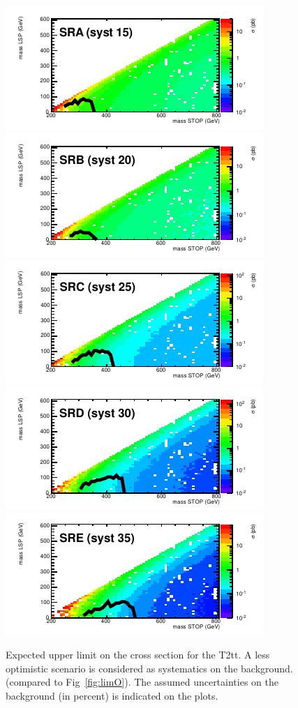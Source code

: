 \begin{figure}[hbt]
  \begin{center}
        \includegraphics[width=0.5\linewidth]{plots/stopPlot/masses_SRA_xsecP.pdf}%
        \includegraphics[width=0.5\linewidth]{plots/stopPlot/masses_SRB_xsecP.pdf}
        \includegraphics[width=0.5\linewidth]{plots/stopPlot/masses_SRC_xsecP.pdf}%
        \includegraphics[width=0.5\linewidth]{plots/stopPlot/masses_SRD_xsecP.pdf}
        \includegraphics[width=0.5\linewidth]{plots/stopPlot/masses_SRE_xsecP.pdf}%
    \caption{Expected upper limit on the cross section for the
      T2tt. A less optimistic scenario is considered as systematics on the
      background. (compared to Fig~\ref{fig:limO}).
The assumed uncertainties on the background (in percent) is indicated on the plots.}
\label{fig:limP}
      \end{center}
\end{figure}

\clearpage
